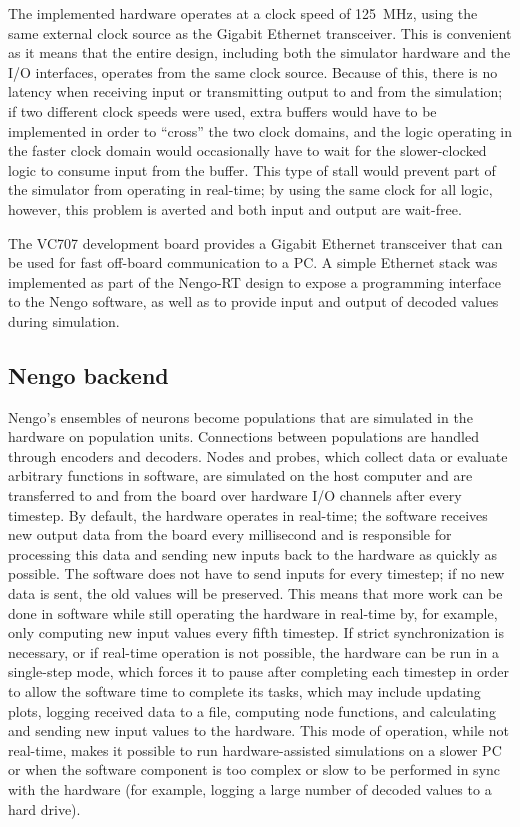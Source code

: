 \documentclass[english]{article}
\begin{document}
The implemented hardware operates at a clock speed of 125~MHz, using the same external clock source as the Gigabit Ethernet transceiver.
This is convenient as it means that the entire design, including both the simulator hardware and the I/O interfaces, operates from the same clock source.
Because of this, there is no latency when receiving input or transmitting output to and from the simulation;
if two different clock speeds were used, extra buffers would have to be implemented in order to ``cross'' the two clock domains,
and the logic operating in the faster clock domain would occasionally have to wait for the slower-clocked logic to consume input from the buffer.
This type of stall would prevent part of the simulator from operating in real-time; by using the same clock for all logic, however, this problem is averted and
both input and output are wait-free.

The VC707 development board provides a Gigabit Ethernet transceiver that can be used for fast off-board communication to a PC.
A simple Ethernet stack was implemented as part of the Nengo-RT design to expose a programming interface to the Nengo software,
as well as to provide input and output of decoded values during simulation.


\subsection{Nengo backend}

Nengo's ensembles of neurons become populations that are simulated in the hardware on population units.
Connections between populations are handled through encoders and decoders.
Nodes and probes, which collect data or evaluate arbitrary functions in software, are
simulated on the host computer and are transferred to and from the board over hardware 
I/O channels after every timestep. 
By default, the hardware operates in real-time; the software receives new output data from the board
every millisecond and is responsible for processing this data and sending new inputs back to the hardware as quickly as possible.
The software does not have to send inputs for every timestep; if no new data is sent, the old values will be preserved.
This means that more work can be done in software while still operating the hardware in real-time by, for example,
only computing new input values every fifth timestep.
If strict synchronization is necessary, or if real-time operation is not possible,
the hardware can be run in a single-step mode, which forces it to pause after completing each timestep in order
to allow the software time to complete its tasks, which may include updating plots, logging received data to a file,
computing node functions, and calculating and sending new input values to the hardware.
This mode of operation, while not real-time, makes it possible to run hardware-assisted simulations
on a slower PC or when the software component is too complex or slow to be performed in sync with the hardware
(for example, logging a large number of decoded values to a hard drive).
\end{document}
